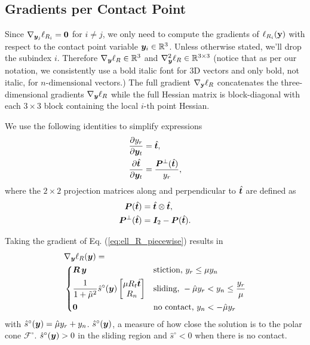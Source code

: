 \subsection{Gradients per Contact Point}
Since $\nabla_{{\bm{y}}_j}\ell_{R_i}={\bm{0}}$ for $i\neq j$, we only need to
compute the gradients of $\ell_{R_i}({\mathbf{y}})$ with respect to the contact point
variable ${\bm{y}}_i\in\mathbb{R}^3$. Unless otherwise stated, we'll drop the
subindex $i$. Therefore $\nabla_{\bm{y}}\ell_R\in\mathbb{R}^3$ and
$\nabla_{\bm{y}}^2\ell_R\in\mathbb{R}^{3\times 3}$ (notice that as per our
notation, we consistently use a bold italic font for 3D vectors and only bold,
not italic, for $n\text{-dimensional}$ vectors.) The full gradient
$\nabla_{\mathbf{y}}\ell_R$ concatenates the three-dimensional gradients
$\nabla_{\bm{y}}\ell_R$ while the full Hessian matrix is block-diagonal with each
$3\times 3$ block containing the local $i\text{-th}$ point Hessian.

We use the following identities to simplify expressions
\begin{align*}
	\frac{\partial y_r}{\partial{\bm{y}}_t} &= \hat{{\bm{t}}}\nonumber,\\
	\frac{\partial \hat{{\bm{t}}}}{\partial{\bm{y}}_t} &=
	\frac{{\bm{P}}^\perp(\hat{{\bm{t}}})}{y_r},
\end{align*}
where the $2\times 2$ projection matrices along and perpendicular to
$\hat{{\bm{t}}}$ are defined as
\begin{align*}
	{\bm{P}}(\hat{{\bm{t}}}) &= \hat{{\bm{t}}}\otimes\hat{{\bm{t}}}\nonumber,\\
	{\bm{P}}^\perp(\hat{{\bm{t}}})&={\bm{I}}_2 - {\bm{P}}(\hat{{\bm{t}}}).
\end{align*}

Taking the gradient of Eq. (\ref{eq:ell_R_piecewise}) results in
\begin{align}
	&\nabla_\vf{y}\ell_R(\vf{y}) = 
	\label{eq:gradient_ell_R_piecewise}\\
&\begin{dcases}
	\vf{R}\,\vf{y} & 
	\text{stiction, } y_r \le \mu y_n\\
	\frac{1}{1+\tilde\mu^2}\hat{s}^\circ(\vf{y})\begin{bmatrix}
		\mu R_t\hat{\vf{t}}\\
		R_n\\
	\end{bmatrix} &
	\text{sliding, } -\hat\mu y_r < y_n \leq \frac{y_r}{\mu}\\
    \vf{0} & \text{no contact, } y_n < -\hat\mu y_r
\end{dcases}\nonumber
\end{align}
with $\hat{s}^\circ({\bm{y}}) = \hat{\mu}y_r+y_n$. $\hat{s}^\circ({\bm{y}})$, a
measure of how close the solution is to the polar cone $\mathcal{F}^\circ$.
$\hat{s}^\circ({\bm{y}}) > 0$ in the sliding region and $\hat{s}^\circ<0$ when
there is no contact. 

